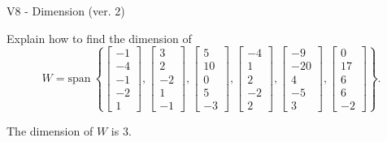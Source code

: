 \begin{exercise}
  \begin{exerciseTitle}V8 - Dimension (ver. 2)\end{exerciseTitle}
  \begin{exerciseStatement}
    Explain how to find the dimension of 
\[W=\mathrm{span}\ \left\{\left[\begin{array}{r}
-1 \\
-4 \\
-1 \\
-2 \\
1
\end{array}\right] , \left[\begin{array}{r}
3 \\
2 \\
-2 \\
1 \\
-1
\end{array}\right] , \left[\begin{array}{r}
5 \\
10 \\
0 \\
5 \\
-3
\end{array}\right] , \left[\begin{array}{r}
-4 \\
1 \\
2 \\
-2 \\
2
\end{array}\right] , \left[\begin{array}{r}
-9 \\
-20 \\
4 \\
-5 \\
3
\end{array}\right] , \left[\begin{array}{r}
0 \\
17 \\
6 \\
6 \\
-2
\end{array}\right]\right\}.\]



  \end{exerciseStatement}
  \begin{exerciseAnswer}
   The dimension of \(W\) is  \(3\).
  


  \end{exerciseAnswer}
\end{exercise}